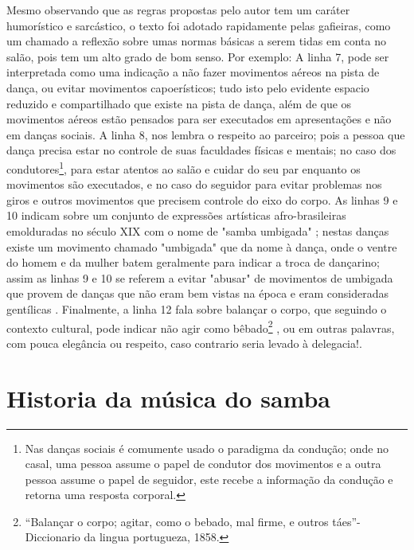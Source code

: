 Mesmo observando que as regras propostas pelo autor tem um caráter humorístico e sarcástico,
o texto foi adotado rapidamente pelas gafieiras, como um chamado a reflexão sobre umas
normas básicas a serem tidas em conta no salão, pois tem um alto grado de bom senso. Por exemplo: 
A linha 7, pode ser interpretada como uma indicação a 
não fazer movimentos aéreos na pista de dança,
ou  evitar movimentos capoerísticos; tudo isto
pelo evidente espacio reduzido e compartilhado que existe na pista de dança, 
além de que os movimentos aéreos estão pensados para ser
executados em apresentações e não em danças sociais. 
A linha 8, nos lembra o respeito ao parceiro; pois a pessoa que dança precisa
estar no controle de suas faculdades físicas e mentais; 
no caso dos condutores\footnote{\label{footlab:conducao}Nas danças sociais é comumente usado o paradigma da condução; 
onde no casal, uma pessoa assume o papel de condutor dos movimentos e 
a outra pessoa assume o papel de seguidor, este recebe a informação da condução e retorna uma resposta corporal.}, 
para estar atentos ao salão e cuidar do seu par enquanto os movimentos são executados, 
e no caso do seguidor para evitar problemas
nos giros e outros movimentos que precisem  controle do eixo do corpo.
As linhas 9 e 10 indicam sobre um conjunto de expressões artísticas 
afro-brasileiras emolduradas no século XIX com o nome de "samba umbigada" \cite[pp. 47]{diniz2008almanaque} \cite[pp. 85]{sandroni2001feitico}; nestas danças existe
um movimento chamado "umbigada" \cite{da2015historia} que da nome à dança, onde o ventre do homem e da mulher batem geralmente para indicar
a troca de dançarino; assim as linhas 9 e 10 se referem a
 evitar "abusar" de movimentos de umbigada que provem de danças que não eram bem vistas na época e eram consideradas gentílicas \cite[pp. 85]{sandroni2001feitico}.
Finalmente,
a linha 12 fala sobre balançar o corpo, que seguindo o contexto cultural, 
pode indicar não agir como bêbado\footnote{``Balançar o corpo; agitar, como o bebado, mal firme, e outros táes''-Diccionario da lingua portugueza, 1858.} \cite[pp.296]{diccionario1858}, ou em outras palavras,
com pouca elegância ou respeito,
caso contrario seria levado à delegacia!.



\section{Historia da música do samba}




